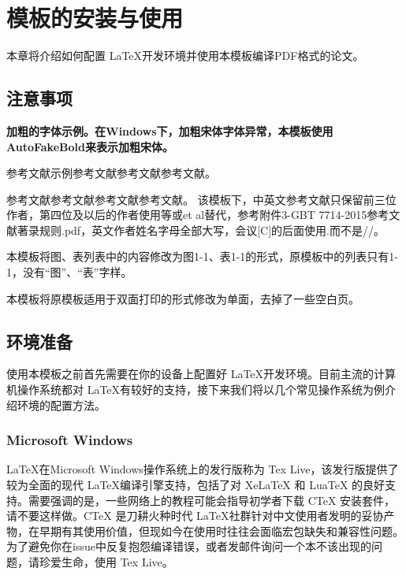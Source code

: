 \chapter{模板的安装与使用}
\label{chp:installation}

本章将介绍如何配置 \LaTeX 开发环境并使用本模板编译PDF格式的论文。

\section{注意事项}

\textbf{加粗的字体示例。在Windows下，加粗宋体字体异常，本模板使用AutoFakeBold来表示加粗宋体。}

参考文献示例\cite{JSJX202411005}参考文献\citet{JSJX202411005}参考文献参考文献。

参考文献\cite{tseng2021codedbulk}参考文献\citet{tseng2021codedbulk}参考文献参考文献。
该模板下，中英文参考文献只保留前三位作者，第四位及以后的作者使用等或et al替代，参考附件3-GBT 7714-2015参考文献著录规则.pdf，英文作者姓名字母全部大写，会议[C]的后面使用.而不是//。

本模板将图、表列表中的内容修改为图1-1、表1-1的形式，原模板中的列表只有1-1，没有“图”、“表”字样。

本模板将原模板适用于双面打印的形式修改为单面，去掉了一些空白页。

\section{环境准备}
\label{sec:tex_environment}

使用本模板之前首先需要在你的设备上配置好 \LaTeX 开发环境。目前主流的计算机操作系统都对 \LaTeX 有较好的支持，接下来我们将以几个常见操作系统为例介绍环境的配置方法。

\subsection{Microsoft Windows\texttrademark}

\LaTeX 在Microsoft Windows操作系统上的发行版称为 Tex Live，该发行版提供了较为全面的现代 \LaTeX 编译引擎支持，包括了对 XeLaTeX 和 LuaTeX 的良好支持。需要强调的是，一些网络上的教程可能会指导初学者下载 CTeX 安装套件，请不要这样做。CTeX 是刀耕火种时代 \LaTeX 社群针对中文使用者发明的妥协产物，在早期有其使用价值，但现如今在使用时往往会面临宏包缺失和兼容性问题\cite{muzi2020ctex}。为了避免你在issue中反复抱怨编译错误，或者发邮件询问一个本不该出现的问题，请珍爱生命，使用 Tex Live。

